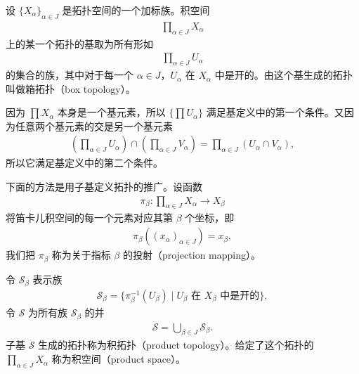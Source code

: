 \documentclass[../../main.tex]{subfiles}
\begin{document}
\begin{definition}[箱拓扑与积拓扑]\label{definition:ch02-箱拓扑积拓扑}
设 $\{X_{\alpha}\}_{\alpha \in J}$ 是拓扑空间的一个加标族。积空间
\begin{align*}
\prod_{\alpha \in J} X_{\alpha}
\end{align*}
上的某一个拓扑的基取为所有形如
\begin{align*}
\prod_{\alpha \in J} U_{\alpha}
\end{align*}
的集合的族，其中对于每一个 $\alpha \in J$，$U_{\alpha}$ 在 $X_{\alpha}$ 中是开的。由这个基生成的拓扑叫做箱拓扑（box topology）。

因为 $\prod X_{\alpha}$ 本身是一个基元素，所以 $\{\prod U_{\alpha}\}$ 满足基定义中的第一个条件。又因为任意两个基元素的交是另一个基元素
\begin{align*}
\left(\prod_{\alpha \in J} U_{\alpha}\right) \cap \left(\prod_{\alpha \in J} V_{\alpha}\right) = \prod_{\alpha \in J} (U_{\alpha} \cap V_{\alpha}),
\end{align*}
所以它满足基定义中的第二个条件。

下面的方法是用子基定义拓扑的推广。设函数
\begin{align*}
\pi_{\beta}: \prod_{\alpha \in J} X_{\alpha} \longrightarrow X_{\beta}
\end{align*}
将笛卡儿积空间的每一个元素对应其第 $\beta$ 个坐标，即
\begin{align*}
\pi_{\beta}((x_{\alpha})_{\alpha \in J}) = x_{\beta},
\end{align*}
我们把 $\pi_{\beta}$ 称为关于指标 $\beta$ 的投射（projection mapping）。

令 $\mathcal{S}_{\beta}$ 表示族
\begin{align*}
\mathcal{S}_{\beta} = \{\pi_{\beta}^{-1}(U_{\beta}) \mid U_{\beta} \text{ 在 } X_{\beta} \text{ 中是开的}\},
\end{align*}
令 $\mathcal{S}$ 为所有族 $\mathcal{S}_{\beta}$ 的并
\begin{align*}
\mathcal{S} = \bigcup_{\beta \in J} \mathcal{S}_{\beta}.
\end{align*}
子基 $\mathcal{S}$ 生成的拓扑称为积拓扑（product topology）。给定了这个拓扑的 $\prod_{\alpha \in J} X_{\alpha}$ 称为积空间（product space）。
\end{definition}
\end{document}
